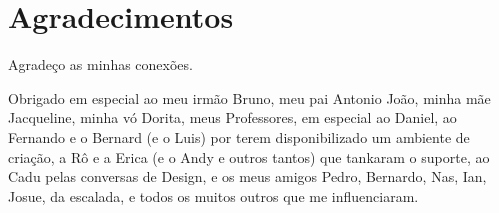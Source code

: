 \chapter*{Agradecimentos}

Agradeço as minhas conexões.

Obrigado em especial ao meu irmão Bruno, meu pai Antonio João, minha mãe Jacqueline, minha vó Dorita, meus Professores, em especial ao Daniel, ao Fernando e o Bernard (e o Luis) por terem disponibilizado um ambiente de criação, a Rô e a Erica (e o Andy e outros tantos) que tankaram o suporte, ao Cadu pelas conversas de Design, e os meus amigos Pedro, Bernardo, Nas, Ian, Josue, da escalada, e todos os muitos outros que me influenciaram.